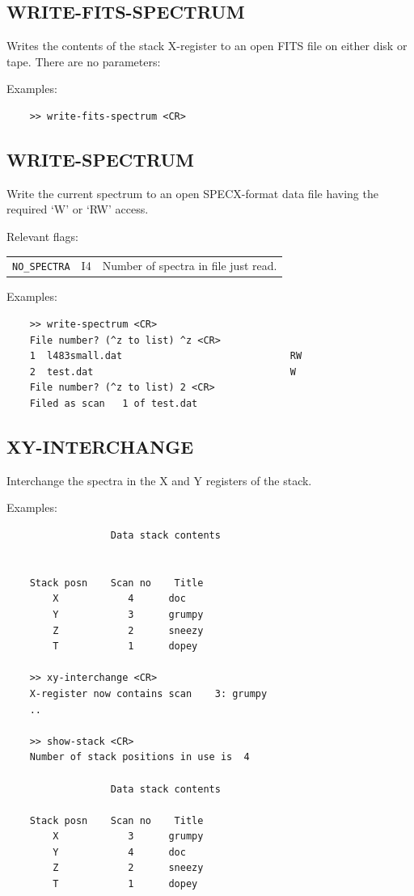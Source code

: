 \documentclass[11pt,twoside]{report}
\begin{document}
\subsection{WRITE-FITS-SPECTRUM} 

Writes the contents of the stack X-register to an open FITS file on
either disk or tape. There are no parameters:

Examples:
\begin{verbatim}
    >> write-fits-spectrum <CR>
\end{verbatim}

\subsection{WRITE-SPECTRUM} 

Write the current spectrum to an open  SPECX-format data file having the
required `W' or `RW' access.

Relevant flags:\\
\begin{tabular}{lll}
  \verb+NO_SPECTRA+ & I4 & Number of spectra in file just read.
\end{tabular}

Examples:
\begin{verbatim}
    >> write-spectrum <CR>
    File number? (^z to list) ^z <CR>
    1  l483small.dat                             RW
    2  test.dat                                  W
    File number? (^z to list) 2 <CR>
    Filed as scan   1 of test.dat
\end{verbatim}

\subsection{XY-INTERCHANGE} 

Interchange the spectra in the X and Y registers of the stack.

Examples:
\begin{verbatim}
                  Data stack contents


    Stack posn    Scan no    Title
        X            4      doc
        Y            3      grumpy
        Z            2      sneezy
        T            1      dopey

    >> xy-interchange <CR>
    X-register now contains scan    3: grumpy
    ..

    >> show-stack <CR>
    Number of stack positions in use is  4

                  Data stack contents

    Stack posn    Scan no    Title
        X            3      grumpy
        Y            4      doc
        Z            2      sneezy
        T            1      dopey
\end{verbatim}
\end{document}
